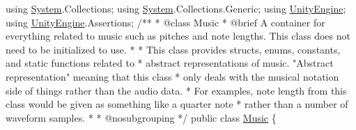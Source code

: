 \begin{DoxyCodeInclude}
\textcolor{keyword}{using} \hyperlink{namespace_system}{System}.Collections;
\textcolor{keyword}{using} \hyperlink{namespace_system}{System}.Collections.Generic;
\textcolor{keyword}{using} \hyperlink{namespace_unity_engine}{UnityEngine};
\textcolor{keyword}{using} \hyperlink{namespace_unity_engine}{UnityEngine}.Assertions;
\textcolor{comment}{}
\textcolor{comment}{/**}
\textcolor{comment}{ * @class Music}
\textcolor{comment}{ * @brief A container for everything related to music such as pitches and note lengths. This class does not
       need to be initialized to use.}
\textcolor{comment}{ * }
\textcolor{comment}{ * This class provides structs, enums, constants, and static functions related to }
\textcolor{comment}{ * abstract representations of music. "Abstract representation" meaning that this class}
\textcolor{comment}{ * only deals with the musical notation side of things rather than the audio data. }
\textcolor{comment}{ * For examples, note length from this class would be given as something like a quarter note }
\textcolor{comment}{ * rather than a number of waveform samples.}
\textcolor{comment}{ * }
\textcolor{comment}{ * @nosubgrouping}
\textcolor{comment}{*/}
\textcolor{keyword}{public} \textcolor{keyword}{class }\hyperlink{class_music}{Music}
\{


\end{DoxyCodeInclude}

